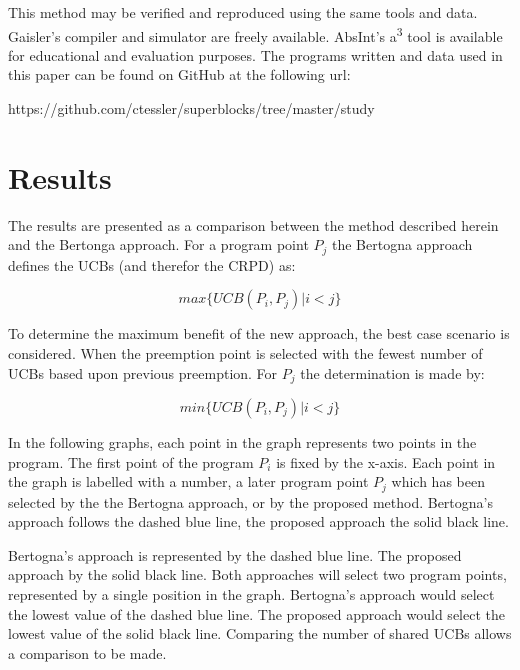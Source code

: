 \documentclass[12pt]{article}
\begin{document}
This method may be verified and reproduced using the same tools and
data. Gaisler's compiler and simulator are freely available. AbsInt's
a\textsuperscript{3} tool is available for educational and evaluation
purposes. The programs written and data used in this paper can be
found on GitHub at the following url:

\begin{center}
https://github.com/ctessler/superblocks/tree/master/study
\end{center}


\section{Results}

The results are presented as a comparison between the method described
herein and the Bertonga approach. For a program point ${P_j}$ the
Bertogna approach defines the UCBs (and therefor the CRPD) as:

\begin{equation*}
  max\{ UCB(P_i, P_j) \vert i < j \}
\end{equation*}

To determine the maximum benefit of the new approach, the best case
scenario is considered. When the preemption point is selected with the
fewest number of UCBs based upon previous preemption.  For ${P_j}$ the
determination is made by:

\begin{equation*}
  min\{ UCB(P_i, P_j) \vert i < j \}
\end{equation*}


In the following graphs, each point in the graph represents two points
in the program. The first point of the program ${P_i}$ is fixed by the
x-axis. Each point in the graph is labelled with a number, a later
program point ${P_j}$ which has been selected by the the Bertogna
approach, or by the proposed method. Bertogna's approach follows the
dashed blue line, the proposed approach the solid black line.

Bertogna's approach is represented by the dashed blue line. The proposed
approach by the solid black line. Both approaches will select two
program points, represented by a single position in the
graph. Bertogna's approach would select the lowest value of the dashed
blue line. The proposed approach would select the lowest value of the
solid black line. Comparing the number of shared UCBs allows a
comparison to be made.
\end{document}
